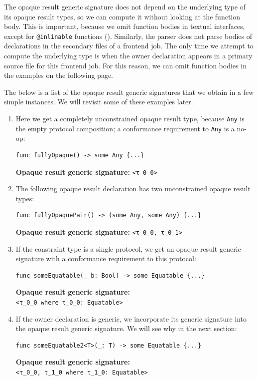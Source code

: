 \documentclass[../generics]{subfiles}
\begin{document}
The opaque result generic signature does not depend on the underlying type of its opaque result types, so we can compute it without looking at the function body. This is important, because we omit function bodies in textual interfaces, except for \verb|@inlinable| functions (). Similarly, the parser does not parse bodies of declarations in the secondary files of a frontend job. The only time we attempt to compute the underlying type is when the owner declaration appears in a primary source file for this frontend job. For this reason, we can omit function bodies in the examples on the following page.

\begin{example}
The below is a list of the opaque result generic signatures that we obtain in a few simple instances. We will revisit some of these examples later.
\begin{enumerate}
\item Here we get a completely unconstrained opaque result type, because \texttt{Any} is the empty protocol composition; a conformance requirement to \texttt{Any} is a no-op:
\begin{Verbatim}
func fullyOpaque() -> some Any {...}
\end{Verbatim}
\textbf{Opaque result generic signature:} \verb|<τ_0_0>|

\item The following opaque result declaration has two unconstrained opaque result types:
\begin{Verbatim}
func fullyOpaquePair() -> (some Any, some Any) {...}
\end{Verbatim}
\textbf{Opaque result generic signature:} \verb|<τ_0_0, τ_0_1>|

\item If the constraint type is a single protocol, we get an opaque result generic signature with a conformance requirement to this protocol:
\begin{Verbatim}
func someEquatable(_ b: Bool) -> some Equatable {...}
\end{Verbatim}
\textbf{Opaque result generic signature:}\\
\verb|<τ_0_0 where τ_0_0: Equatable>|

\item If the owner declaration is generic, we incorporate its generic signature into the opaque result generic signature. We will see why in the next section:
\begin{Verbatim}
func someEquatable2<T>(_: T) -> some Equatable {...}
\end{Verbatim}
\textbf{Opaque result generic signature:}\\
\verb|<τ_0_0, τ_1_0 where τ_1_0: Equatable>|


\end{enumerate}
\end{example}
\end{document}
